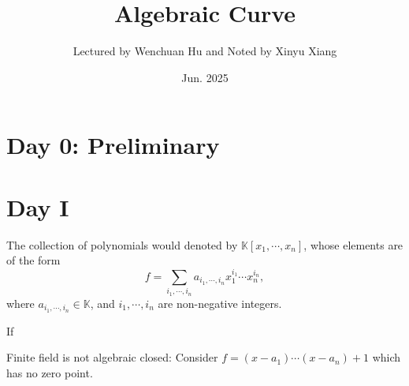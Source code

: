 \documentclass[10pt]{article}
\title{\textbf{Algebraic Curve}}
\author{Lectured by Wenchuan Hu and Noted by Xinyu Xiang}
\date{Jun. 2025}
\begin{document}
\maketitle

\section{Day 0: Preliminary}

\section{Day I}

%

\begin{definition}[Polynomial]
  The collection of polynomials would denoted by $ \mathbb{K}[x_1,\cdots ,x_{n}]$, whose elements are of the form
  \begin{equation*}
    f = \sum_{i_1,\cdots ,i_n} a_{i_1,\cdots ,i_n} x_1^{i_1}\cdots x_n^{i_n},
  \end{equation*}
  where $ a_{i_1,\cdots ,i_n} \in \mathbb{K}$, and $ i_1,\cdots ,i_n$ are non-negative integers.
\end{definition}

\begin{definition}
  If
\end{definition}

\begin{remark}
  Finite field is not algebraic closed: Consider $ f = (x - a_{1}) \cdots (x - a_{n}) + 1$ which has no zero point.
\end{remark}

\begin{definition}

\end{definition}
\end{document}
